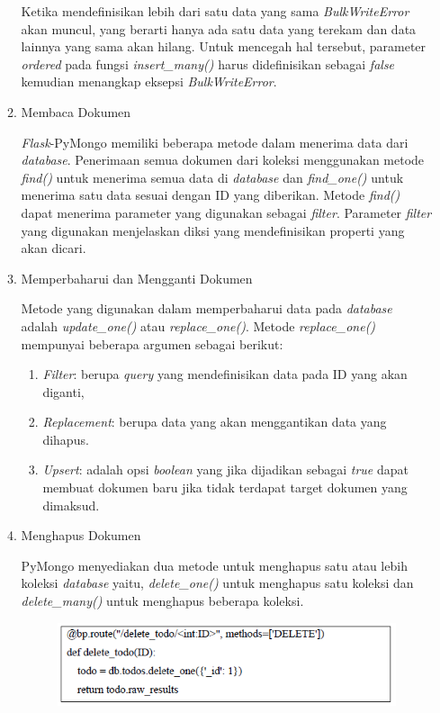 \begin{enumerate}
\begin{enumerate}
		Ketika mendefinisikan lebih dari satu data yang sama \emph{BulkWriteError} akan muncul, yang berarti hanya ada satu data yang terekam dan data lainnya yang sama akan hilang. Untuk mencegah hal tersebut, parameter \emph{ordered} pada fungsi \emph{insert\_many()} harus didefinisikan sebagai \emph{false} kemudian menangkap eksepsi \emph{BulkWriteError}.
		
		\item Membaca Dokumen
		
		\emph{Flask}-PyMongo memiliki beberapa metode dalam menerima data dari \emph{database}. Penerimaan semua dokumen dari koleksi menggunakan metode \emph{find()} untuk menerima semua data di \emph{database} dan \emph{find\_one()} untuk menerima satu data sesuai dengan ID yang diberikan. Metode \emph{find()} dapat menerima parameter yang digunakan sebagai \emph{filter}. Parameter \emph{filter} yang digunakan menjelaskan diksi yang mendefinisikan properti yang akan dicari.
		
		\item Memperbaharui dan Mengganti Dokumen
		
		Metode yang digunakan dalam memperbaharui data pada \emph{database} adalah \emph{update\_one()} atau \emph{replace\_one()}. Metode \emph{replace\_one()} mempunyai beberapa argumen sebagai berikut:
		
		\begin{enumerate}
			\item \emph{Filter}: berupa \emph{query} yang mendefinisikan data pada ID yang akan diganti,
			
			\item \emph{Replacement}: berupa data yang akan menggantikan data yang dihapus.
			
			\item \emph{Upsert}: adalah opsi \emph{boolean} yang jika dijadikan sebagai \emph{true} dapat membuat dokumen baru jika tidak terdapat target dokumen yang dimaksud.
			
		\end{enumerate}
	
	\item Menghapus Dokumen
	
	PyMongo menyediakan dua metode untuk menghapus satu atau lebih koleksi \emph{database} yaitu, \emph{delete\_one()} untuk menghapus satu koleksi dan \emph{delete\_many()} untuk menghapus beberapa koleksi.
	
	\begin{figure}[H]
		\centering
		\includegraphics[width=12cm]{gambar/mongoDB5.png}
	\end{figure}


\end{enumerate}
\end{enumerate}
